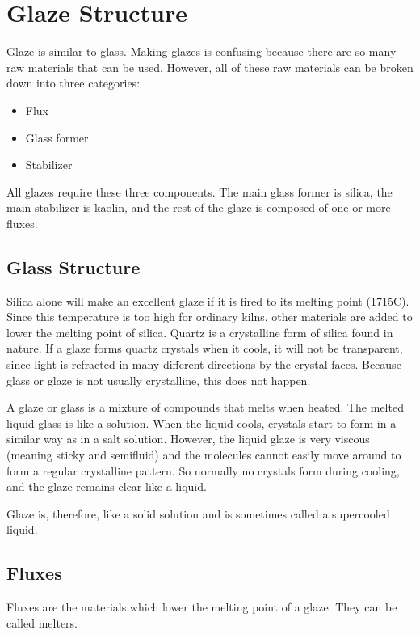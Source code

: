 \section{Glaze Structure}
Glaze is similar to glass. Making glazes is confusing because there are so many 
raw materials that can be used. However, all of these raw materials can be 
broken down into three categories:
\begin{itemize}
\item Flux
\item Glass former
\item Stabilizer
\end{itemize}
All glazes require these three components. The main glass former is silica, the 
main stabilizer is kaolin, and the rest of the glaze is composed of one or more 
fluxes.
\subsection{Glass Structure}
Silica  alone will make an excellent glaze if it is fired to its 
melting point (1715\degree C). Since this temperature is too high for ordinary 
kilns, other materials are added to lower the melting point of silica. Quartz 
is a crystalline form of silica found in nature. If a glaze forms quartz 
crystals when it cools, it will not be transparent, since light is refracted in 
many different directions by the crystal faces. Because glass or glaze is not 
usually crystalline, this does not happen.

A glaze or glass is a mixture of compounds that melts when heated. The melted 
liquid glass is like a solution. When the liquid cools, crystals start to form 
in a similar way as in a salt solution. However, the liquid glaze is very 
viscous (meaning sticky and semifluid) and the molecules cannot easily move 
around to form a regular crystalline pattern. So normally no crystals form 
during cooling, and the glaze remains clear like a liquid.

Glaze is, therefore, like a solid solution and is sometimes called a 
supercooled liquid.
\subsection{Fluxes}
Fluxes are the materials which lower the melting point of a glaze. They can be 
called melters.

